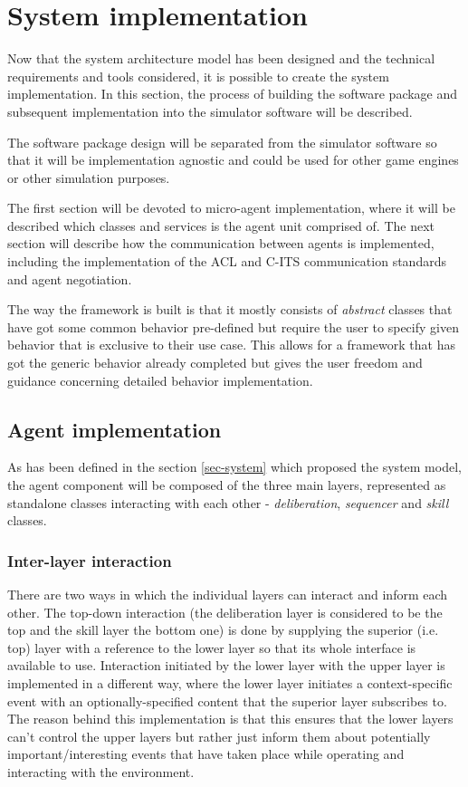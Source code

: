 \documentclass[0main.tex]{subfiles}
\begin{document}
\section{System implementation}

Now that the system architecture model has been designed and the technical requirements and
tools considered, it is possible to create the system implementation. In this section, the
process of building the software package and subsequent implementation into the simulator
software will be described. 

The software package design will be separated from the simulator software so that it will be 
implementation agnostic and could be used for other game engines or other simulation purposes. 

The first section will be devoted to micro-agent implementation, where it will be described which 
classes and services is the agent unit comprised of. The next section will describe how the 
communication between agents is implemented, including the implementation of the ACL and C-ITS communication 
standards and agent negotiation. 

The way the framework is built is that it mostly consists of \emph{abstract} classes that have got some 
common behavior pre-defined but require the user to specify given behavior that is exclusive to their 
use case. This allows for a framework that has got the generic behavior already completed but 
gives the user freedom and guidance concerning detailed behavior implementation. 

\subsection{Agent implementation}

As has been defined in the section \ref{sec-system} which proposed the system model, the agent component 
will be composed of the three main layers, represented as standalone classes interacting with 
each other - \emph{deliberation}, \emph{sequencer} and \emph{skill} classes.

\subsubsection{Inter-layer interaction}

There are two ways in which the individual layers can interact and inform each other. The top-down 
interaction (the deliberation layer is considered to be the top and the skill layer the bottom one) 
is done by supplying the superior (i.e. top) layer with a reference to the lower layer so that 
its whole interface is available to use. Interaction initiated by the lower layer with the upper layer 
is implemented in a different way, where the lower layer initiates a context-specific event with an 
optionally-specified content that the superior layer subscribes to. The reason behind this implementation
is that this ensures that the lower layers can't control the upper layers but rather just inform them about 
potentially important/interesting events that have taken place while operating and interacting with 
the environment.
\end{document}
